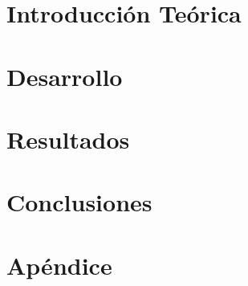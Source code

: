\documentclass[11pt,a4paper]{article}
\begin{document}
\maketitle

\tableofcontents

\newpage

\section{Introducción Teórica}



\section{Desarrollo}



\section{Resultados}



\section{Conclusiones}



\newpage

\section{Apéndice}


\end{document}
